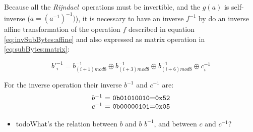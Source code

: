 \documentclass[10pt,a4paper,twoside]{llncs}
\newcommand{\rijndael}{\emph{Rijndael}}
\begin{document}
Because all the \rijndael\, operations must be invertible, and the $g(a)$ is self-inverse ($a=(a^{-1})^{-1})$), it is necessary to have an inverse $f^{-1}$ by do an inverse affine transformation of the operation $f$ described in equation \ref{eq:invSubBytes:affine} and also expressed as matrix operation in \ref{eq:subBytes:matrix}:

\begin{equation}\label{eq:invSubBytes:affine}
 b'^{-1}_{i} = b^{-1}_{(i+1)mod8} \oplus b^{-1}_{(i+3)mod8} \oplus 
          b^{-1}_{(i+6)mod8} \oplus c^{-1}_{i}
\end{equation}

For the inverse operation their inverse $b^{-1}$ and $c^{-1}$ are:
\begin{equation}
 \begin{tabular}{c}
  $b^{-1}$ = \texttt{0b01010010}=\texttt{0x52}\\
  $c^{-1}$ = \texttt{0b00000101}=\texttt{0x05}
 \end{tabular}
\end{equation}

\begin{itemize}
 \item todo{What's the relation between $b$ and $b$ $b^{-1}$, and between $c$ and $c^{-1}$?}
\end{itemize}
\end{document}
